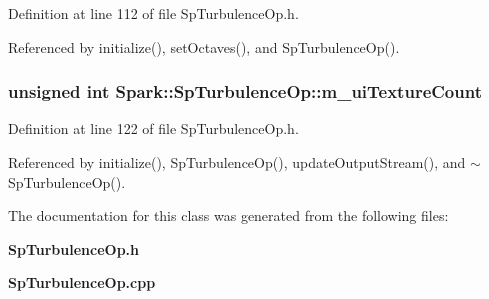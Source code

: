 Definition at line 112 of file Sp\-Turbulence\-Op.h.

Referenced by initialize(), set\-Octaves(), and Sp\-Turbulence\-Op().
\subsubsection{\setlength{\rightskip}{0pt plus 5cm}unsigned int {\bf Spark::Sp\-Turbulence\-Op::m\_\-ui\-Texture\-Count}\hspace{0.3cm}{\tt  [protected]}}\label{classSpark_1_1SpTurbulenceOp_p17}


Definition at line 122 of file Sp\-Turbulence\-Op.h.

Referenced by initialize(), Sp\-Turbulence\-Op(), update\-Output\-Stream(), and $\sim$Sp\-Turbulence\-Op().

The documentation for this class was generated from the following files:\begin{CompactItemize}
\item 
{\bf Sp\-Turbulence\-Op.h}\item 
{\bf Sp\-Turbulence\-Op.cpp}\end{CompactItemize}
